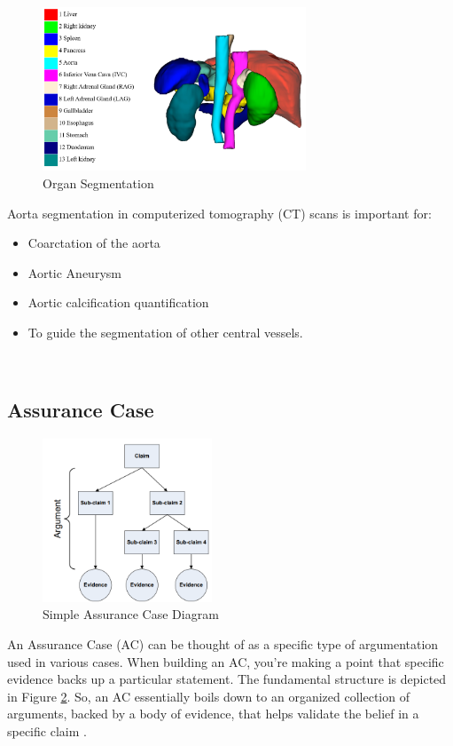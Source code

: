 \begin{figure}[ht]
    \centering
    \includegraphics[width=0.7\textwidth]{figures/Intro/segmentation.png}
    \caption[Organ Segmentation]{Organ Segmentation \cite{Ma-2021-AbdomenCT-1K}}
    \label{fig_seg}
\end{figure}

Aorta segmentation in computerized tomography (CT) scans is important for:
\begin{itemize}
\item Coarctation of the aorta
\item Aortic Aneurysm
\item Aortic calcification quantification
\item To guide the segmentation of other central vessels. 
\end{itemize} ~

\subsection{Assurance Case}
\begin{figure}[ht]
    \centering
    \includegraphics[width=0.45\textwidth]{figures/Intro/ac_diagram.png}
    \caption[Simple Assurance Case Diagram]{Simple Assurance Case Diagram \cite{doi:10.2514/6.2009-1921}}
    \label{fig_ac_diagram}
\end{figure}

An Assurance Case (AC) can be thought of as a specific type of argumentation used in various cases. When building an AC, you're making a point that specific evidence backs up a particular statement. The fundamental structure is depicted in Figure \ref{fig_ac_diagram}. So, an AC essentially boils down to an organized collection of arguments, backed by a body of evidence, that helps validate the belief in a specific claim \cite{doi:10.2514/6.2009-1921}.


